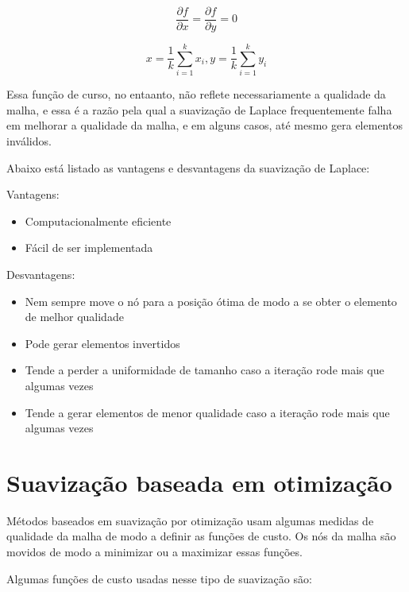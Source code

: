 \begin{equation*}
    \frac{\partial f}{\partial x} = \frac{\partial f}{\partial y} = 0
\end{equation*}

\begin{equation*}
    x = \frac{1}{k} \sum_{i=1}^k x_i, y = \frac{1}{k} \sum_{i=1}^k y_i
\end{equation*}

Essa função de curso, no entaanto, não reflete necessariamente a qualidade da malha, e essa é a razão pela qual a suavização de Laplace frequentemente falha em melhorar a qualidade da malha, e em alguns casos, até mesmo gera elementos inválidos.

Abaixo está listado as vantagens e desvantagens da suavização de Laplace:

Vantagens:
\begin{itemize}
    \item Computacionalmente eficiente
    \item Fácil de ser implementada
\end{itemize}

Desvantagens:
\begin{itemize}
    \item Nem sempre move o nó para a posição ótima de modo a se obter o elemento de melhor qualidade
    \item Pode gerar elementos invertidos
    \item Tende a perder a uniformidade de tamanho caso a iteração rode mais que algumas vezes
    \item Tende a gerar elementos de menor qualidade caso a iteração rode mais que algumas vezes
\end{itemize}

\section{Suavização baseada em otimização}

Métodos baseados em suavização por otimização usam algumas medidas de qualidade da malha de modo a definir as funções de custo. Os nós da malha são movidos de modo a minimizar ou a maximizar essas funções.

Algumas funções de custo usadas nesse tipo de suavização são:

